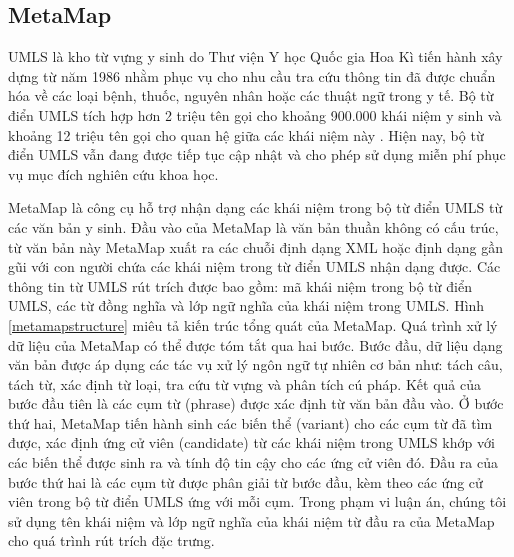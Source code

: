 \subsection*{MetaMap}
UMLS là kho từ vựng y sinh do Thư viện Y học Quốc gia Hoa Kì tiến hành xây dựng từ năm 1986 nhằm phục vụ cho nhu cầu tra cứu thông tin đã được chuẩn hóa về các loại bệnh, thuốc, nguyên nhân hoặc các thuật ngữ trong y tế. Bộ từ điển UMLS tích hợp hơn 2 triệu tên gọi cho khoảng 900.000 khái niệm y sinh và khoảng 12 triệu tên gọi cho quan hệ giữa các khái niệm này \cite{Olivier2004}. Hiện nay, bộ từ điển UMLS vẫn đang được tiếp tục cập nhật và cho phép sử dụng miễn phí phục vụ mục đích nghiên cứu khoa học.

MetaMap là công cụ hỗ trợ nhận dạng các khái niệm trong bộ từ điển UMLS từ các văn bản y sinh. Đầu vào của MetaMap là văn bản thuần không có cấu trúc, từ văn bản này MetaMap xuất ra các chuỗi định dạng XML hoặc định dạng gần gũi với con người chứa các khái niệm trong từ điển UMLS nhận dạng được. Các thông tin từ UMLS rút trích được bao gồm: mã khái niệm trong bộ từ điển UMLS, các từ đồng nghĩa và lớp ngữ nghĩa của khái niệm trong UMLS. Hình \ref{metamapstructure} miêu tả kiến trúc tổng quát của MetaMap. Quá trình xử lý dữ liệu của MetaMap có thể được tóm tắt qua hai bước. Bước đầu, dữ liệu dạng văn bản được áp dụng các tác vụ xử lý ngôn ngữ tự nhiên cơ bản như: tách câu, tách từ, xác định từ loại, tra cứu từ vựng và phân tích cú pháp. Kết quả của bước đầu tiên là các cụm từ (phrase) được xác định từ văn bản đầu vào. Ở bước thứ hai, MetaMap tiến hành sinh các biến thể (variant) cho các cụm từ đã tìm được, xác định ứng cử viên (candidate) từ các khái niệm trong UMLS khớp với các biến thể được sinh ra và tính độ tin cậy cho các ứng cử viên đó. Đầu ra của bước thứ hai là các cụm từ được phân giải từ bước đầu, kèm theo các ứng cử viên trong bộ từ điển UMLS ứng với mỗi cụm. Trong phạm vi luận án, chúng tôi sử dụng tên khái niệm và lớp ngữ nghĩa của khái niệm từ đầu ra của MetaMap cho quá trình rút trích đặc trưng.

